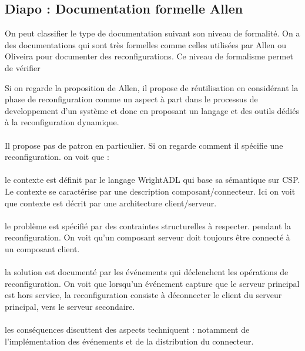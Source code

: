 \subsection{Diapo : Documentation formelle Allen}
On peut classifier le type de documentation suivant son niveau de
formalité. On a des documentations qui sont très formelles comme
celles utilisées par Allen ou Oliveira pour documenter des
reconfigurations. Ce niveau de formalisme permet de vérifier

Si on regarde la proposition de Allen, il propose  de
réutilisation en considérant la phase de reconfiguration comme un
aspect à part dans le processus de developpement d'un système et donc
en proposant un langage et des outils dédiés à la reconfiguration
dynamique. 
%

\paragraph{} 
Il propose pas de patron en particulier. Si on regarde comment il
spécifie une reconfiguration. on voit que : 
%
\paragraph{} 
le contexte est définit par le langage WrightADL qui base sa
sémantique sur CSP. 
Le contexte se caractérise par une description composant/connecteur.
Ici on voit que contexte est décrit par une architecture
client/serveur.
%
\paragraph{} 
le problème est spécifié par des contraintes structurelles à respecter. pendant la
reconfiguration. On voit qu'un composant serveur doit toujours être connecté à
un composant client.  
%
\paragraph{} 
la solution est documenté par les événements qui déclenchent les
opérations de reconfiguration. On voit que lorsqu'un événement capture
que le serveur principal est hors service, la reconfiguration consiste
à déconnecter le client du serveur principal, vers le serveur
secondaire.
%
\paragraph{} 
les conséquences discuttent des aspects techniquent : notamment de
l'implémentation des événements et de la distribution du connecteur.  

